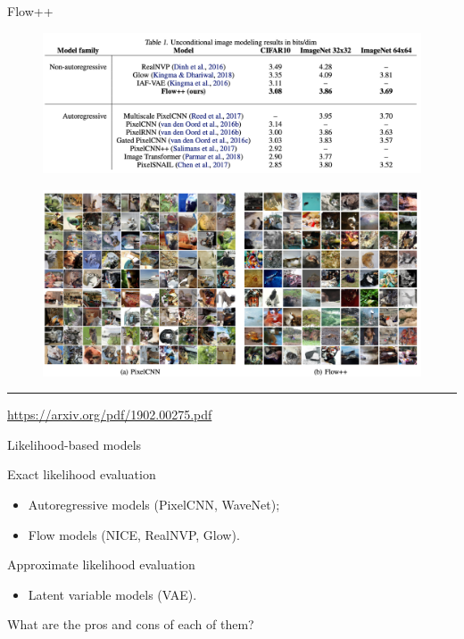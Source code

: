 \documentclass{beamer}
\begin{document}
\begin{frame}{Flow++}
	\begin{figure}
		\centering
		\includegraphics[width=0.7\linewidth]{figs/flow++1.png}
	\end{figure}
	\vspace{-0.1cm}
	\begin{figure}
		\centering
		\includegraphics[width=0.8\linewidth]{figs/flow++2.png}
	\end{figure}
	\vfill
	\hrule\medskip
	{\scriptsize \href{https://arxiv.org/pdf/1902.00275.pdf}{https://arxiv.org/pdf/1902.00275.pdf}}
\end{frame}
\begin{frame}{Likelihood-based models}
	\begin{block}{Exact likelihood evaluation}
		\begin{itemize}
			\item Autoregressive models (PixelCNN, WaveNet);
			\item Flow models (NICE, RealNVP, Glow).
		\end{itemize}
	\end{block}
	\begin{block}{Approximate likelihood evaluation}
		\begin{itemize}
			\item Latent variable models (VAE).
		\end{itemize}
	\end{block}
	What are the pros and cons of each of them? \\
	\vspace{0.2cm}
\end{frame}
\end{document}
